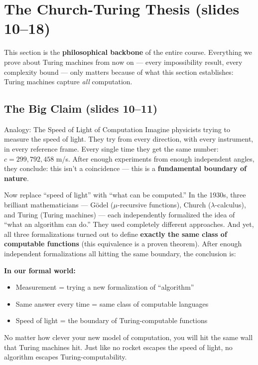 \section{The Church-Turing Thesis (slides 10--18)} \kemark

This section is the \textbf{philosophical backbone} of the entire course.
Everything we prove about Turing machines from now on --- every impossibility
result, every complexity bound --- only matters because of what this section
establishes: Turing machines capture \emph{all} computation.

\subsection{The Big Claim (slides 10--11)}

\begin{notebox}{Analogy: The Speed of Light of Computation}
Imagine physicists trying to measure the speed of light. They try from every
direction, with every instrument, in every reference frame. Every single time
they get the same number: $c = 299{,}792{,}458$ m/s. After enough experiments
from enough independent angles, they conclude: this isn't a coincidence ---
this is a \textbf{fundamental boundary of nature}.

Now replace ``speed of light'' with ``what can be computed.'' In the 1930s,
three brilliant mathematicians --- G\"odel ($\mu$-recursive functions), Church
($\lambda$-calculus), and Turing (Turing machines) --- each independently
formalized the idea of ``what an algorithm can do.'' They used completely
different approaches. And yet, all three formalizations turned out to define
\textbf{exactly the same class of computable functions} (this equivalence is a
proven theorem). After enough independent formalizations all hitting the same
boundary, the conclusion is:

\textbf{In our formal world:}
\begin{itemize}[nosep]
\item Measurement = trying a new formalization of ``algorithm''
\item Same answer every time = same class of computable languages
\item Speed of light = the boundary of Turing-computable functions
\end{itemize}

No matter how clever your new model of computation, you will hit the same wall
that Turing machines hit. Just like no rocket escapes the speed of light, no
algorithm escapes Turing-computability.
\end{notebox}

